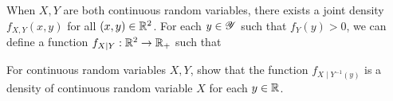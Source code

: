 \documentclass[letterpaper,10pt,english]{article}
\begin{document}
\begin{defn} When $X, Y$ are both continuous random variables, 
there exists a joint density $f_{X,Y}(x,y)$ for all $(x, y) \in \mathbb{R}^2$. 
For each $y \in \mathscr{Y}$ such that $f_Y(y) > 0$, we can define a function $f_{X\mid Y}: \mathbb{R}^2 \to \mathbb{R}_+$ such that   
\end{defn}
\begin{tcolorbox}
\begin{exerc}
For continuous random variables $X,Y$, 
show that the function $f_{X\mid Y^{-1}(y)}$ is a density of continuous random variable $X$ for each $y\in \mathbb{R}$. 
\end{exerc}
\end{tcolorbox}
\end{document}
